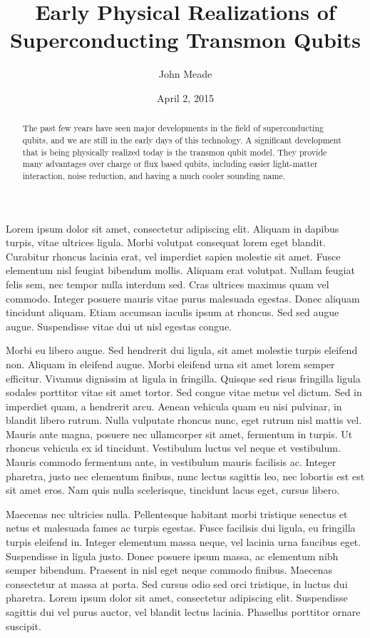 \documentclass[12pt,letterpaper,notitlepage]{report}
\begin{document}
\title{Early Physical Realizations of Superconducting Transmon Qubits}
\author{John Meade}
\date{April 2, 2015}

\maketitle

\begin{abstract}
\doublespacing
\noindent
The past few years have seen major developments in the field of superconducting qubits, and we are still in the early days of this technology. A significant development that is being physically realized today is the transmon qubit model. They provide many advantages over charge or flux based qubits, including easier light-matter interaction, noise reduction, and having a much cooler sounding name.
\end{abstract}

\pagebreak
\doublespacing
Lorem ipsum \cite{foo} dolor sit amet, consectetur adipiscing elit. Aliquam in dapibus turpis, vitae ultrices ligula. Morbi volutpat consequat lorem eget blandit. Curabitur rhoncus lacinia erat, vel imperdiet sapien molestie sit amet. Fusce elementum nisl feugiat bibendum mollis. Aliquam erat volutpat. Nullam feugiat felis sem, nec tempor nulla interdum sed. Cras ultrices maximus quam vel commodo. Integer posuere mauris vitae purus malesuada egestas. Donec aliquam tincidunt aliquam. Etiam accumsan iaculis ipsum at rhoncus. Sed sed augue augue. Suspendisse vitae dui ut nisl egestas congue.

Morbi eu libero augue. Sed hendrerit dui ligula, sit amet molestie turpis eleifend non. Aliquam in eleifend augue. Morbi eleifend urna sit amet lorem semper efficitur. Vivamus dignissim at ligula in fringilla. Quisque sed risus fringilla ligula sodales porttitor vitae sit amet tortor. Sed congue vitae metus vel dictum. Sed in imperdiet quam, a hendrerit arcu. Aenean vehicula quam eu nisi pulvinar, in blandit libero rutrum. Nulla vulputate rhoncus nunc, eget rutrum nisl mattis vel. Mauris ante magna, posuere nec ullamcorper sit amet, fermentum in turpis. Ut rhoncus vehicula ex id tincidunt. Vestibulum luctus vel neque et vestibulum. Mauris commodo fermentum ante, in vestibulum mauris facilisis ac. Integer pharetra, justo nec elementum finibus, nunc lectus sagittis leo, nec lobortis est est sit amet eros. Nam quis nulla scelerisque, tincidunt lacus eget, cursus libero.

Maecenas nec ultricies nulla. Pellentesque habitant morbi tristique senectus et netus et malesuada fames ac turpis egestas. Fusce facilisis dui ligula, eu fringilla turpis eleifend in. Integer elementum massa neque, vel lacinia urna faucibus eget. Suspendisse in ligula justo. Donec posuere ipsum massa, ac elementum nibh semper bibendum. Praesent in nisl eget neque commodo finibus. Maecenas consectetur at massa at porta. Sed cursus odio sed orci tristique, in luctus dui pharetra. Lorem ipsum dolor sit amet, consectetur adipiscing elit. Suspendisse sagittis dui vel purus auctor, vel blandit lectus lacinia. Phasellus porttitor ornare suscipit.
\end{document}
